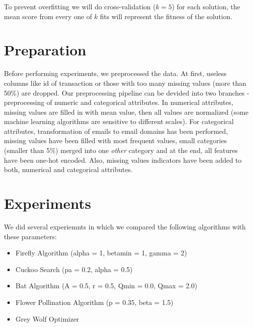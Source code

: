 \documentclass[runningheads]{llncs}
\begin{document}
To prevent overfitting we will do cross-validation ($k=5$) for each solution, the mean score from every one of $k$ fits will represent the fitness of the solution.




\section{Preparation}

Before performing experiments, we preprocessed the data. At first, useless columns like id of transaction or those with too many missing values (more than 50\%) are dropped. Our preprocessing pipeline can be devided into two branches - preprocessing of numeric and categorical attributes. In numerical attributes, missing values are filled in with mean value, then all values are normalized (some machine learning algorithms are sensitive to different scales). For categorical attributes, transformation of emails to email domains has been performed, missing values have been filled with most frequent values, small categories (smaller than 5\%) merged into one \textit{other} category and at the end, all features have been one-hot encoded. Also, missing values indicators have been added to both, numerical and categorical attributes.



\section{Experiments}

We did several experiemnts in which we compared the following algorithms with these parameters:

\begin{itemize}
	\item Firefly Algorithm (alpha = 1, betamin = 1, gamma = 2)
	\item Cuckoo Search (pa = 0.2, alpha = 0.5)
	\item Bat Algorithm (A = 0.5, r = 0.5, Qmin = 0.0, Qmax = 2.0)
	\item Flower Pollination Algorithm (p = 0.35, beta = 1.5)
	\item Grey Wolf Optimizer
\end{itemize}
\end{document}
